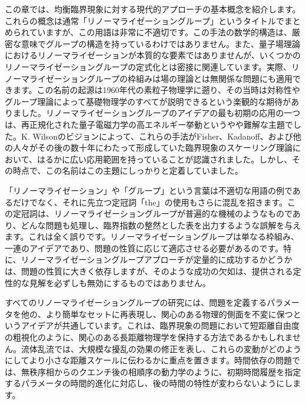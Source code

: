 \documentclass[a4paper,10pt]{ltjsarticle} %
\begin{document}
この章では、均衡臨界現象に対する現代的アプローチの基本概念を紹介します。これらの概念は通常「リノーマライゼーショングループ」というタイトルでまとめられていますが、この用語は非常に不適切です。この手法の数学的構造は、厳密な意味でグループの構造を持っているわけではありません。また、量子場理論におけるリノーマライゼーションが本質的な要素ではありませんが、いくつかのリノーマライゼーショングループの定式化とは密接に関連しています。実際、リノーマライゼーショングループの枠組みは場の理論とは無関係な問題にも適用できます。この名前の起源は1960年代の素粒子物理学に遡り、その当時は対称性やグループ理論によって基礎物理学のすべてが説明できるという楽観的な期待がありました。リノーマライゼーショングループのアイデアの最も初期の応用の一つは、再正規化された量子電磁力学の高エネルギー挙動というやや難解な主題でした。K. Wilsonのビジョンによって、これらの手法がFisher、Kadanoff、および他の人々がその後の数十年にわたって形成していた臨界現象のスケーリング理論において、はるかに広い応用範囲を持っていることが認識されました。しかし、その時点で、この名前はこの主題にしっかりと定着していました。

「リノーマライゼーション」や「グループ」という言葉は不適切な用語の例であるだけでなく、それに先立つ定冠詞「the」の使用もさらに混乱を招きます。この定冠詞は、リノーマライゼーショングループが普遍的な機械のようなものであり、どんな問題も処理し、臨界指数の整然とした表を出力するような誤解を与えます。これは全く誤りです。リノーマライゼーショングループは単なる枠組み、一連のアイデアであり、問題の性質に応じて適応させる必要があるのです。特に、リノーマライゼーショングループアプローチが定量的に成功するかどうかは、問題の性質に大きく依存しますが、そのような成功の欠如は、提供される定性的な見解を必ずしも無効にするものではありません。

すべてのリノーマライゼーショングループの研究には、問題を定義するパラメータを他の、より簡単なセットに再表現し、関心のある物理的側面を不変に保つというアイデアが共通しています。これは、臨界現象の問題において短距離自由度の粗視化のように、関心のある長距離物理学を保持する方法であるかもしれません。流体乱流では、大規模な擾乱の効果の修正を表し、これらの変動がどのようにしてより小さな距離スケールに伝わるかに重点を置きます。時間依存の問題では、無秩序相からのクエンチ後の相順序の動力学のように、初期時間履歴を指定するパラメータの時間的進化に対応し、後の時間の特性が変わらないようにします。
\end{document}
